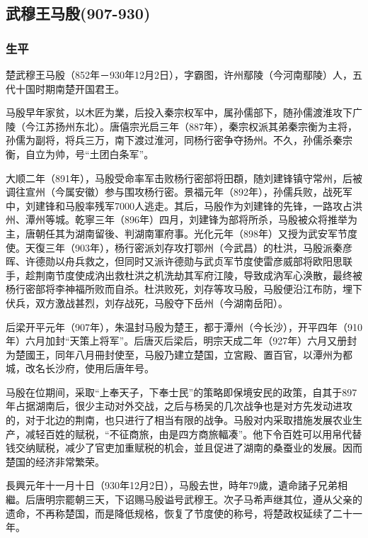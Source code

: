 
\subsection{武穆王马殷\tiny(907-930)}

\subsubsection{生平}

楚武穆王马殷（852年－930年12月2日），字霸图，许州鄢陵（今河南鄢陵）人，五代十国时期南楚开国君王。

马殷早年家贫，以木匠为業，后投入秦宗权军中，属孙儒部下，随孙儒渡淮攻下广陵（今江苏扬州东北）。唐僖宗光启三年（887年），秦宗权派其弟秦宗衡为主将，孙儒为副将，将兵三万，南下渡过淮河，同杨行密争夺扬州。不久，孙儒杀秦宗衡，自立为帅，号“土团白条军”。

大顺二年（891年），马殷受命率军击败杨行密部将田頵，随刘建锋镇守常州，后被调往宣州（今属安徽）参与围攻杨行密。景福元年（892年），孙儒兵败，战死军中，刘建锋和马殷率残军7000人逃走。其后，马殷作为刘建锋的先锋，一路攻占洪州、潭州等城。乾寧三年（896年）四月，刘建锋为部将所杀，马殷被众将推举为主，唐朝任其为湖南留後、判湖南軍府事。光化元年（898年）又授为武安军节度使。天復三年（903年），杨行密派刘存攻打鄂州（今武昌）的杜洪，马殷派秦彦晖、许德勋以舟兵救之，但同时又派许德勋与武贞军节度使雷彦威部将欧阳思联手，趁荆南节度使成汭出救杜洪之机洗劫其军府江陵，导致成汭军心涣散，最终被杨行密部将李神福所败而自杀。杜洪败死，刘存等攻马殷，马殷便沿江布防，埋下伏兵，双方激战甚烈，刘存战死，马殷夺下岳州（今湖南岳阳）。

后梁开平元年（907年），朱温封马殷为楚王，都于潭州（今长沙），开平四年（910年）六月加封“天策上将军”。后唐灭后梁后，明宗天成二年（927年）六月又册封为楚國王，同年八月冊封使至，马殷乃建立楚国，立宮殿、置百官，以潭州为都城，改名长沙府，使用后唐年号。

马殷在位期间，采取“上奉天子，下奉士民”的策略即保境安民的政策，自其于897年占据湖南后，很少主动对外交战，之后与杨吴的几次战争也是对方先发动进攻的，对于北边的荆南，也只进行了相当有限的战争。马殷对内采取措施发展农业生产，减轻百姓的赋税，“不征商旅，由是四方商旅輻凑”。他下令百姓可以用帛代替钱交纳赋税，减少了官吏加重赋税的机会，並且促进了湖南的桑蚕业的发展。因而楚国的经济非常繁荣。

長興元年十一月十日（930年12月2日），马殷去世，時年79歲，遺命諸子兄弟相繼。后唐明宗罷朝三天，下诏赐马殷谥号武穆王。次子马希声继其位，遵从父亲的遗命，不再称楚国，而是降低规格，恢复了节度使的称号，将楚政权延续了二十一年。

